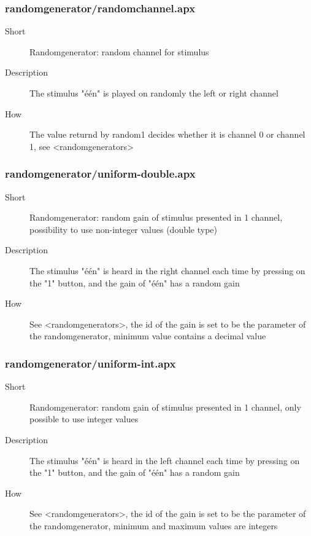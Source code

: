 \subsubsection{randomgenerator/randomchannel.apx}
\begin{description}
\item[Short] 
 Randomgenerator: random channel for stimulus
\item[Description] 
 The stimulus "één" is played on randomly the left or right channel
\item[How] 
 The value returnd by random1 decides whether it is channel 0 or channel 1, see \textless{}randomgenerators\textgreater{}
\end{description}

\subsubsection{randomgenerator/uniform-double.apx}
\begin{description}
\item[Short] 
 Randomgenerator: random gain of stimulus presented in 1 channel, possibility to use non-integer values (double type)
\item[Description] 
 The stimulus "één" is heard in the right channel each time by pressing on the "1" button, and the gain of "één" has a random gain
\item[How] 
 See \textless{}randomgenerators\textgreater{}, the id of the gain is set to be the parameter of the randomgenerator, minimum value contains a decimal value
\end{description}

\subsubsection{randomgenerator/uniform-int.apx}
\begin{description}
\item[Short] 
 Randomgenerator: random gain of stimulus presented in 1 channel, only possible to use integer values
\item[Description] 
 The stimulus "één" is heard in the left channel each time by pressing on the "1" button, and the gain of "één" has a random gain
\item[How] 
 See \textless{}randomgenerators\textgreater{}, the id of the gain is set to be the parameter of the randomgenerator, minimum and maximum values are integers
\end{description}

